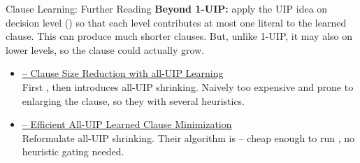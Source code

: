 \documentclass[t]{sdqbeamer}
\begin{document}
\begin{frame}{Clause Learning: Further Reading}
\textbf{Beyond 1-UIP:} apply the UIP idea on  decision level () so that each level contributes at most one literal to the learned clause.
This can produce much shorter clauses. 
But, unlike 1-UIP, it may also  on lower levels, so the clause could actually grow.\\[1em]
\begin{itemize}\itemsep1em
	\item \href{https://doi.org/10.1007/978-3-030-51825-7_3}{ -- Clause Size Reduction with all-UIP Learning}\\[1ex]
	First , then introduces all-UIP shrinking.
	Naively too expensive and prone to enlarging the clause, so they  with several heuristics.

	\item \href{https://doi.org/10.1007/978-3-030-80223-3_12}{ -- Efficient All-UIP Learned Clause Minimization}\\[1ex]
	Reformulate all-UIP shrinking. Their algorithm is  -- cheap enough to run , no heuristic gating needed.
\end{itemize}
\end{frame}
\end{document}
